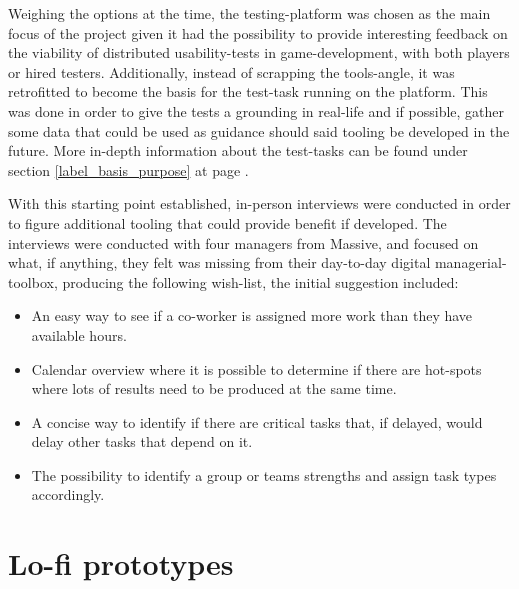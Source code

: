 {Weighing the options at the time, the testing-platform was chosen as the main
focus of the project given it had the possibility to provide interesting
feedback on the viability of distributed usability-tests in game-development,
with both players or hired testers. Additionally, instead of scrapping the
tools-angle, it was retrofitted to become the basis for the test-task running
on the platform. This was done in order to give the tests a grounding in
real-life and if possible, gather some data that could be used as guidance
should said tooling be developed in the future. More in-depth information about
the test-tasks can be found under section \ref{label_basis_purpose} at page
\pageref{label_basis_purpose}.

With this starting point established, in-person interviews were conducted
in order to figure additional tooling that could provide benefit if developed.
The interviews were conducted with four managers from Massive, and focused on
what, if anything, they felt was missing from their day-to-day digital
managerial-toolbox, producing the following wish-list, the initial
suggestion included:


  \newcommand{\ideaOne}{%
    An easy way to see if a co-worker is assigned more work than they have
    available hours.%
  }

  \newcommand{\ideaTwo}{%
    Calendar overview where it is possible to determine if there are
    hot-spots where lots of results need to be produced at the same
    time.%
  }

  \newcommand{\ideaThree}{%
    A concise way to identify if there are critical tasks that, if
    delayed, would delay other tasks that depend on it.%
  }

  \newcommand{\ideaFour}{%
    The possibility to identify a group or teams strengths and assign
    task types accordingly.%
  }

  \begin{itemize}
    \item{\ideaOne\label{label_ideas}}
    \item{\ideaTwo}
    \item{\ideaThree}
    \item{\ideaFour}
  \end{itemize}


\section{Lo-fi prototypes}


}
